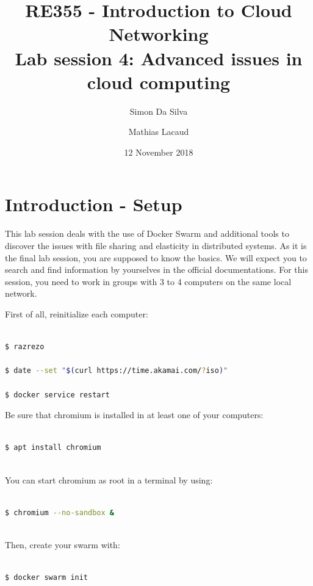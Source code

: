 \documentclass[a4paper,11pt]{exam}
\date{12 November 2018}
\title{RE355 - Introduction to Cloud Networking\\
Lab session 4: Advanced issues in cloud computing}
\author{Simon Da Silva \and Mathias Lacaud}
\begin{document}
\maketitle

\section{Introduction - Setup}

This lab session deals with the use of Docker Swarm and additional tools to discover the issues with file sharing and elasticity in distributed systems. 
As it is the final lab session, you are supposed to know the basics.
We will expect you to search and find information by yourselves in the official documentations.
For this session, you need to work in groups with 3 to 4 computers on the same local network.

First of all, reinitialize each computer:

\begin{lstlisting}[frame=single,language={sh}]  % Start your code-block

$ razrezo

$ date --set "$(curl https://time.akamai.com/?iso)"

$ docker service restart 

\end{lstlisting}

Be sure that chromium is installed in at least one of your computers: 

\begin{lstlisting}[frame=single,language={sh}]  % Start your code-block

$ apt install chromium
	
\end{lstlisting}

You can start chromium as root in a terminal by using: 

\begin{lstlisting}[frame=single,language={sh}]  % Start your code-block

$ chromium --no-sandbox &
		
\end{lstlisting}

Then, create your swarm with: 

\begin{lstlisting}[frame=single,language={sh}]  % Start your code-block

$ docker swarm init

\end{lstlisting}
\end{document}
